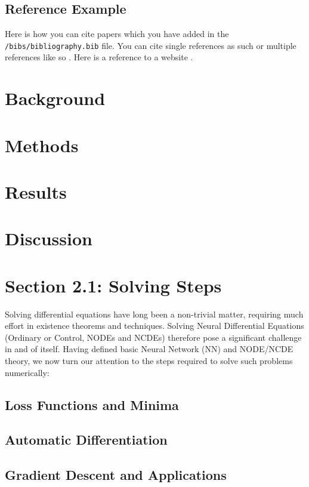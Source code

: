 \documentclass[a4paper,11pt, titlepage]{article}
\theoremstyle{definition}
\theoremstyle{plain}
\theoremstyle{remark}
\begin{document}
\subsection{Reference Example}

Here is how you can cite papers which you have added in the \verb!/bibs/bibliography.bib! file. You can cite single references as such \cite{Einstein1905} or multiple references like so \cite{Dirac1981,Einstein1905}. Here is a reference to a website \cite{Riemann2024}.

\section{Background}

\section{Methods}

\section{Results}

\section{Discussion}

\section{Section 2.1: Solving Steps}
Solving differential equations have long been a non-trivial matter, requiring much effort in existence theorems and techniques. Solving Neural Differential Equations (Ordinary or Control, NODEs and NCDEs) therefore pose a significant challenge in and of itself. Having defined basic Neural Network (NN) and NODE/NCDE theory, we now turn our attention to the steps required to solve such problems numerically:


\subsection{Loss Functions and Minima}

\subsection{Automatic Differentiation}


\subsection{Gradient Descent and Applications}
\end{document}
